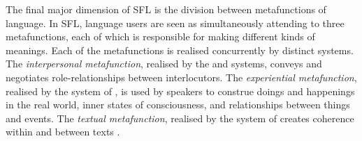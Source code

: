The final major dimension of \gls{SFL} is the division between metafunctions of language. In \gls{SFL}, language users are seen as simultaneously attending to three metafunctions, each of which is responsible for making different kinds of meanings. Each of the metafunctions is realised concurrently by distinct  systems. The \emph{interpersonal metafunction}, realised by the  and  systems, conveys and negotiates role-relationships between interlocutors. The \emph{experiential metafunction}, realised by the system of , is used by speakers to construe doings and happenings in the real world, inner states of consciousness, and relationships between things and events. The \emph{textual metafunction}, realised by the system of  creates coherence within and between texts \cite{eggins_introduction_2004}.




